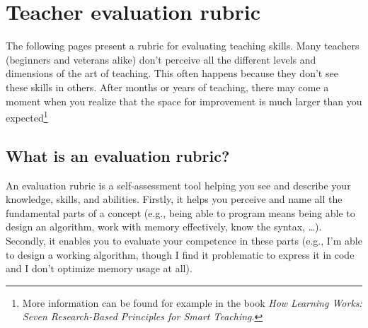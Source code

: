 
\newcommand{\rubriccriterion}[4]{
\stepcounter{rubricquestion}
\section*{\therubricquestion: #1}

\smallskip
\note{Unaware:} #2

\note{Beginner:} #3

\note{Guru:} #4

\medskip
\begin{tikzpicture}
\draw (0,0) -- (8,0);
\foreach \i in {0,1,...,8} %
{
\fill[black] (\i,0) circle (1.5 mm);
\fill[white] (\i,0) circle (1.4 mm);
}
\node at (0.15, -0.5) {unaware};
\node at (3, -0.5)    {beginner};
\node at (8, -0.5)    {guru};
\end{tikzpicture}
}

\restoregeometry
\chapter*{Teacher evaluation rubric}
\label{rubric}

The following pages present a rubric for evaluating teaching skills. Many teachers (beginners and veterans alike) don't perceive all the different levels and dimensions of the art of teaching. This often happens because they don't see these skills in others. After months or years of teaching, there may come a moment when you realize that the space for improvement is much larger than you expected\footnote{More information can be found for example in the book \emph{How Learning Works: Seven Research-Based Principles for Smart Teaching}.}

\section*{What is an evaluation rubric?}

An evaluation rubric is a self-assessment tool helping you see and describe your knowledge, skills, and abilities. Firstly, it helps you perceive and name all the fundamental parts of a concept (e.g., being able to program means being able to design an algorithm, work with memory effectively, know the syntax, \dots). Secondly, it enables you to evaluate your competence in these parts (e.g., I'm able to design a working algorithm, though I find it problematic to express it in code and I don't optimize memory usage at all).

